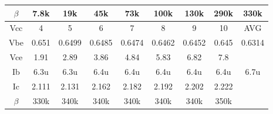 \begin{table}[h]
\begin{tabular}{|ccccccccc|}
\multicolumn{1}{|c|}{$\beta$} & \multicolumn{1}{c|}{7.8k}   & \multicolumn{1}{c|}{19k}    & \multicolumn{1}{c|}{45k}    & \multicolumn{1}{c|}{73k}    & \multicolumn{1}{c|}{100k}   & \multicolumn{1}{c|}{130k}   & \multicolumn{1}{c|}{290k}  & 330k   \\ \hline
\multicolumn{1}{|c|}{Vcc}     & \multicolumn{1}{c|}{4}      & \multicolumn{1}{c|}{5}      & \multicolumn{1}{c|}{6}      & \multicolumn{1}{c|}{7}      & \multicolumn{1}{c|}{8}      & \multicolumn{1}{c|}{9}      & \multicolumn{1}{c|}{10}    & AVG    \\ \hline
\multicolumn{1}{|c|}{Vbe}     & \multicolumn{1}{c|}{0.651}  & \multicolumn{1}{c|}{0.6499} & \multicolumn{1}{c|}{0.6485} & \multicolumn{1}{c|}{0.6474} & \multicolumn{1}{c|}{0.6462} & \multicolumn{1}{c|}{0.6452} & \multicolumn{1}{c|}{0.645} & 0.6314 \\ \hline
\multicolumn{1}{|c|}{Vce}     & \multicolumn{1}{c|}{1.91}   & \multicolumn{1}{c|}{2.89}   & \multicolumn{1}{c|}{3.86}   & \multicolumn{1}{c|}{4.84}   & \multicolumn{1}{c|}{5.83}   & \multicolumn{1}{c|}{6.82}   & \multicolumn{1}{c|}{7.8}   &        \\ \hline
\multicolumn{1}{|c|}{Ib}      & \multicolumn{1}{c|}{6.3u}   & \multicolumn{1}{c|}{6.3u}   & \multicolumn{1}{c|}{6.4u}   & \multicolumn{1}{c|}{6.4u}   & \multicolumn{1}{c|}{6.4u}   & \multicolumn{1}{c|}{6.4u}   & \multicolumn{1}{c|}{6.4u}  & 6.7u   \\ \hline
\multicolumn{1}{|c|}{Ic}      & \multicolumn{1}{c|}{2.111}  & \multicolumn{1}{c|}{2.131}  & \multicolumn{1}{c|}{2.162}  & \multicolumn{1}{c|}{2.182}  & \multicolumn{1}{c|}{2.192}  & \multicolumn{1}{c|}{2.202}  & \multicolumn{1}{c|}{2.222} &        \\ \hline
\multicolumn{1}{|c|}{$\beta$} & \multicolumn{1}{c|}{330k}   & \multicolumn{1}{c|}{340k}   & \multicolumn{1}{c|}{340k}   & \multicolumn{1}{c|}{340k}   & \multicolumn{1}{c|}{340k}   & \multicolumn{1}{c|}{340k}   & \multicolumn{1}{c|}{350k}  &        \\ \hline
\end{tabular}
\end{table}
\FloatBarrier
